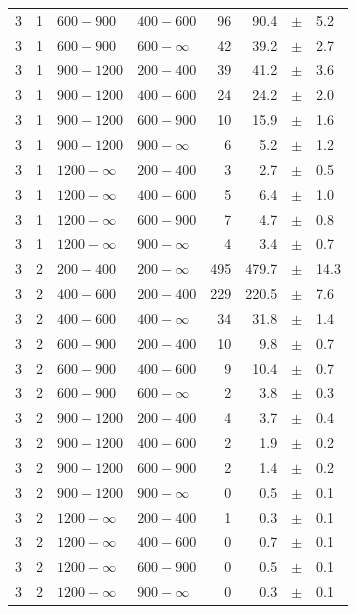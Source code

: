 \begin{table}[!h]
\begin{tabular}{rrllrrcl}
3 & 1 & $ 600- 900$ & $400-600$ &     96 &     90.4 &$\pm$&    5.2 \\
3 & 1 & $ 600- 900$ & $600-\infty$ &     42 &     39.2 &$\pm$&    2.7 \\
3\T & 1 & $ 900-1200$ & $200-400$ &     39 &     41.2 &$\pm$&    3.6 \\
3 & 1 & $ 900-1200$ & $400-600$ &     24 &     24.2 &$\pm$&    2.0 \\
3 & 1 & $ 900-1200$ & $600-900$ &     10 &     15.9 &$\pm$&    1.6 \\
3 & 1 & $ 900-1200$ & $900-\infty$ &      6 &      5.2 &$\pm$&    1.2 \\
3\T & 1 & $1200- \infty$ & $200-400$ &      3 &      2.7 &$\pm$&    0.5 \\
3 & 1 & $1200- \infty$ & $400-600$ &      5 &      6.4 &$\pm$&    1.0 \\
3 & 1 & $1200- \infty$ & $600-900$ &      7 &      4.7 &$\pm$&    0.8 \\
3 & 1 & $1200- \infty$ & $900-\infty$ &      4 &      3.4 &$\pm$&    0.7 \\
3\T & 2 & $ 200- 400$ & $200-\infty$ &    495 &    479.7 &$\pm$&   14.3 \\
3\T & 2 & $ 400- 600$ & $200-400$ &    229 &    220.5 &$\pm$&    7.6 \\
3 & 2 & $ 400- 600$ & $400-\infty$ &     34 &     31.8 &$\pm$&    1.4 \\
3\T & 2 & $ 600- 900$ & $200-400$ &     10 &      9.8 &$\pm$&    0.7 \\
3 & 2 & $ 600- 900$ & $400-600$ &      9 &     10.4 &$\pm$&    0.7 \\
3 & 2 & $ 600- 900$ & $600-\infty$ &      2 &      3.8 &$\pm$&    0.3 \\
3\T & 2 & $ 900-1200$ & $200-400$ &      4 &      3.7 &$\pm$&    0.4 \\
3 & 2 & $ 900-1200$ & $400-600$ &      2 &      1.9 &$\pm$&    0.2 \\
3 & 2 & $ 900-1200$ & $600-900$ &      2 &      1.4 &$\pm$&    0.2 \\
3 & 2 & $ 900-1200$ & $900-\infty$ &      0 &      0.5 &$\pm$&    0.1 \\
3\T & 2 & $1200- \infty$ & $200-400$ &      1 &      0.3 &$\pm$&    0.1 \\
3 & 2 & $1200- \infty$ & $400-600$ &      0 &      0.7 &$\pm$&    0.1 \\
3 & 2 & $1200- \infty$ & $600-900$ &      0 &      0.5 &$\pm$&    0.1 \\
3 & 2 & $1200- \infty$ & $900-\infty$ &      0 &      0.3 &$\pm$&    0.1 \\

\end{tabular}
\end{table}
